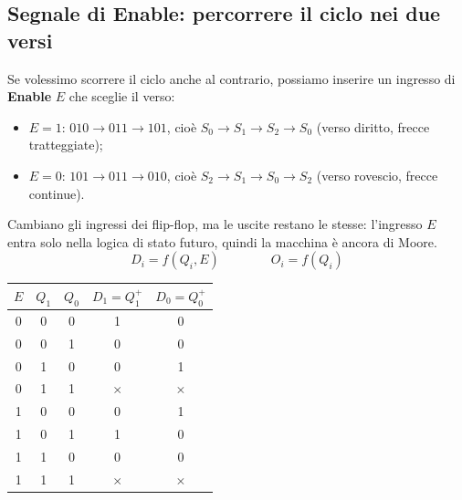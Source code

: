\subsection{Segnale di Enable: percorrere il ciclo nei due versi}

Se volessimo scorrere il ciclo anche al contrario, possiamo inserire un ingresso di
\textbf{Enable} $E$ che sceglie il verso:
\begin{itemize}[leftmargin=1.5em, itemsep=1pt]
    \item $E=1$: $010 \to 011 \to 101$, cioè $S_0\to S_1\to S_2\to S_0$ (verso diritto,
          frecce tratteggiate);
    \item $E=0$: $101 \to 011 \to 010$, cioè $S_2\to S_1\to S_0\to S_2$ (verso rovescio,
          frecce continue).
\end{itemize}

\begin{center}
\end{center}

\noindent Cambiano gli ingressi dei flip-flop, ma le uscite restano le stesse: l'ingresso
$E$ entra solo nella logica di stato futuro, quindi la macchina è ancora di Moore.
\[
D_i = f(Q_i, E) \qquad\qquad O_i = f(Q_i)
\]

\begin{center}
\begin{tabular}{c|cc|cc}
\toprule
$E$ & $Q_1$ & $Q_0$ & $D_1=Q_1^+$ & $D_0=Q_0^+$ \\
\midrule
0 & 0 & 0 & 1 & 0 \\
0 & 0 & 1 & 0 & 0 \\
0 & 1 & 0 & 0 & 1 \\
0 & 1 & 1 & $\times$ & $\times$ \\
\midrule
1 & 0 & 0 & 0 & 1 \\
1 & 0 & 1 & 1 & 0 \\
1 & 1 & 0 & 0 & 0 \\
1 & 1 & 1 & $\times$ & $\times$ \\
\bottomrule
\end{tabular}
\end{center}

